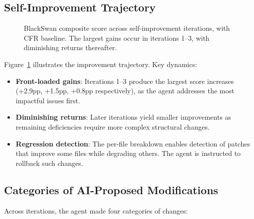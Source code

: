 \documentclass[conference,11pt]{IEEEtran}
\begin{document}
\subsection{Self-Improvement Trajectory}

\begin{figure}[t]
\centering
{}
\caption{BlackSwan composite score across self-improvement iterations, with CFR baseline. The largest gains occur in iterations 1--3, with diminishing returns thereafter.}
\label{fig:trajectory}
\end{figure}

Figure~\ref{fig:trajectory} illustrates the improvement trajectory. Key dynamics:

\begin{itemize}
    \item \textbf{Front-loaded gains}: Iterations 1--3 produce the largest score increases (+2.9pp, +1.5pp, +0.8pp respectively), as the agent addresses the most impactful issues first.
    \item \textbf{Diminishing returns}: Later iterations yield smaller improvements as remaining deficiencies require more complex structural changes.
    \item \textbf{Regression detection}: The per-file breakdown enables detection of patches that improve some files while degrading others. The agent is instructed to rollback such changes.
\end{itemize}

\subsection{Categories of AI-Proposed Modifications}

Across iterations, the agent made four categories of changes:
\end{document}
